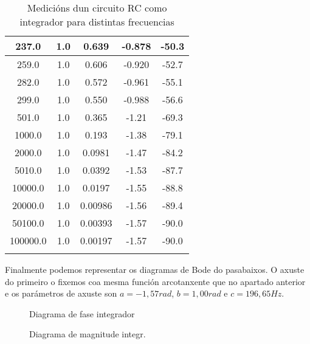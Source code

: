\documentclass[12pt, a4paper, titlepage]{article}
\begin{document}
\begin{table}[H]
\begin{minipage}{0.49\textwidth}
\begin{tabular}{|c|c|c|c|c|}
        237.0    & 1.0 & 0.639   & -0.878   & -50.3 \\ \hline
        259.0    & 1.0 & 0.606   & -0.920    & -52.7 \\ \hline
        282.0    & 1.0 & 0.572   & -0.961   & -55.1 \\ \hline
        299.0    & 1.0 & 0.550    & -0.988   & -56.6 \\ \hline
        501.0    & 1.0 & 0.365   & -1.21    & -69.3 \\ \hline
        1000.0   & 1.0 & 0.193   & -1.38    & -79.1 \\ \hline
        2000.0   & 1.0 & 0.0981  & -1.47    & -84.2 \\ \hline
        5010.0   & 1.0 & 0.0392  & -1.53    & -87.7 \\ \hline
        10000.0  & 1.0 & 0.0197  & -1.55    & -88.8 \\ \hline
        20000.0  & 1.0 & 0.00986 & -1.56    & -89.4 \\ \hline
        50100.0  & 1.0 & 0.00393 & -1.57    & -90.0 \\ \hline
        100000.0 & 1.0 & 0.00197 & -1.57    & -90.0 \\ \hline
         &  &  &  & \\ \hline
        \end{tabular}
      \end{minipage}
      \caption{Medicións dun circuito RC como integrador para distintas frecuencias}
    \end{table}

    Finalmente podemos representar os diagramas de Bode do pasabaixos.
    O axuste do primeiro o fixemos coa mesma función arcotanxente que no apartado anterior e os parámetros de axuste son
    $a = -1,57 rad$, $b = 1,00 rad$ e $c = 196,65 Hz$.

    \begin{minipage}{0.49\textwidth}
      \centering
      \begin{figure}[H]
        \hspace{-32pt}
        \scalebox{0.65}{}
        \caption{Diagrama de fase integrador}
      \end{figure}
    \end{minipage}
    \begin{minipage}{0.49\textwidth}
      \centering
      \begin{figure}[H]
        \hspace{-16pt}
        \scalebox{0.65}{}
        \caption{Diagrama de magnitude integr.}
      \end{figure}
    \end{minipage}
\end{document}
